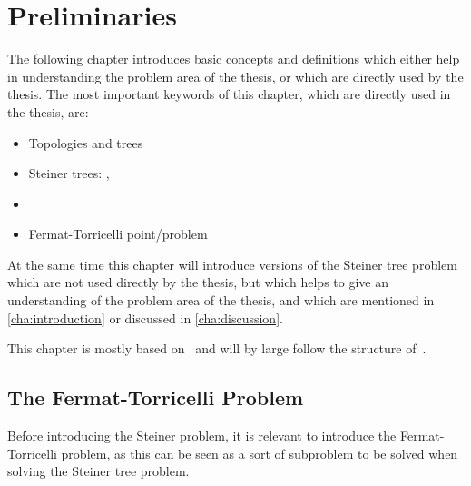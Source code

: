 {
\abnormalparskip{0pt}
\chapter{Preliminaries}
\label{cha:preliminaries}
}

The following chapter introduces basic concepts and definitions which either
help in understanding the problem area of the thesis, or which are directly used
by the thesis. The most important keywords of this chapter, which are directly
used in the thesis, are:
%
\begin{itemize}
\item Topologies and trees
\item Steiner trees: , 
\item {}
\item Fermat-Torricelli point/problem
\end{itemize}
%
At the same time this chapter will introduce versions of the Steiner tree
problem which are not used directly by the thesis, but which helps to give an
understanding of the problem area of the thesis, and which are mentioned in
\cref{cha:introduction} or discussed in \cref{cha:discussion}.

This chapter is mostly based on~\textcite{smith1992,gilbert1968,brazil2015} and
will by large follow the structure of~\cite[ch.~1]{brazil2015}.

\section{The Fermat-Torricelli Problem}
\label{sec:ferm-torr-probl}

Before introducing the Steiner problem, it is relevant to introduce the
Fermat-Torricelli problem, as this can be seen as a sort of subproblem to be
solved when solving the Steiner tree problem.

